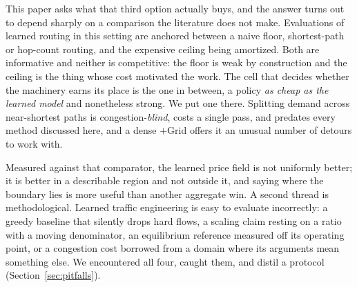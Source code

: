 \documentclass[journal]{IEEEtran}
\begin{document}
This paper asks what that third option actually buys, and the answer turns out to depend
sharply on a comparison the literature does not make. Evaluations of learned routing in this
setting are anchored between a naive floor, shortest-path or hop-count routing, and the
expensive ceiling being amortized. Both are informative and neither is competitive: the floor
is weak by construction and the ceiling is the thing whose cost motivated the work. The cell
that decides whether the machinery earns its place is the one in between, a policy \emph{as
cheap as the learned model} and nonetheless strong. We put one there. Splitting demand across
near-shortest paths is congestion-\emph{blind}, costs a single pass, and predates every method
discussed here, and a dense $+$Grid offers it an unusual number of detours to work with.

Measured against that comparator, the learned price field is not uniformly better; it is better
in a describable region and not outside it, and saying where the boundary lies is more useful
than another aggregate win. A second thread is methodological. Learned traffic engineering is
easy to evaluate incorrectly: a greedy baseline that silently drops hard flows, a scaling claim
resting on a ratio with a moving denominator, an equilibrium reference measured off its
operating point, or a congestion cost borrowed from a domain where its arguments mean something
else. We encountered all four, caught them, and distil a protocol
(Section~\ref{sec:pitfalls}).
\end{document}
